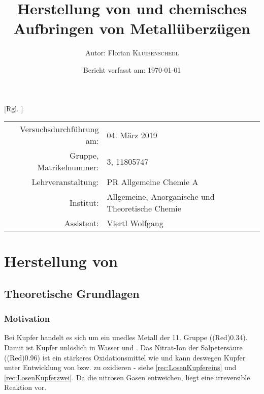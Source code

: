 \documentclass{article}
\title{Herstellung von \ch{CuSO4 * 5 H2O} und chemisches Aufbringen von Metallüberzügen \cite{Versuchsvorschrift}} %
\author{Autor: Florian \textsc{Kluibenschedl}} %
\date{Bericht verfasst am: \today} %
\begin{document}
  [Rgl. ]{}{}
  
  \maketitle %
  
  \begin{center}
    \begin{tabular}{r p{4cm}}
      Versuchsdurchführung am: & 04. März 2019\\ %
      Gruppe, Matrikelnummer: & 3, 11805747 \\
      Lehrveranstaltung: & PR Allgemeine Chemie A \\
      Institut: & Allgemeine, Anorganische und Theoretische Chemie \\
      Assistent: & Viertl Wolfgang %
    \end{tabular}
  \end{center}


  \begin{abstract}
    
  \end{abstract}
  
  \pagebreak
  
  \section{Herstellung von }
  
    \subsection{Theoretische Grundlagen}
  
      \subsubsection{Motivation} \label{sec:MotivationKupfer}
        
        Bei Kupfer handelt es sich um ein unedles Metall der 11. Gruppe (\ElPot[superscript=0](Red){0.34}). Damit ist Kupfer unlöslich in Wasser und . Das Nitrat-Ion der Salpetersäure (\ElPot[superscript=0](Red){0.96}) ist ein stärkeres Oxidationsmittel wie  und kann deswegen Kupfer unter Entwicklung von  bzw.  zu  oxidieren - siehe \ref{rec:LosenKupfereins} und \ref{rec:LosenKupferzwei}. Da die nitrosen Gasen entweichen, liegt eine irreversible Reaktion vor.
        
\end{document}
